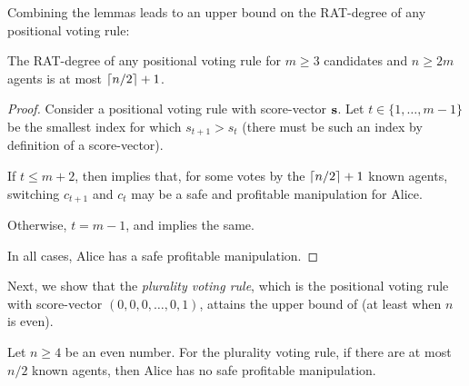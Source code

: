 Combining the lemmas leads to an upper bound on the RAT-degree of any positional voting rule:
\begin{theorem}
\label{thm:upper-positional}
The RAT-degree of any positional voting rule for $m\geq 3$ candidates and $n\geq 2m$ agents is at most $\left\lceil n/2 \right\rceil+1$.
\end{theorem}
\begin{proof}
Consider a positional voting rule with score-vector $\mathbf{s}$. Let $t \in \{1,\ldots,m-1\}$ be the smallest index for which $s_{t+1} > s_t$ (there must be such an index by definition of a score-vector).

If $t\leq m+2$, then  implies that, for some votes by the $\left\lceil n/2 \right\rceil+1$ known agents, switching $c_{t+1}$ and $c_t$ may be a safe and profitable manipulation for Alice.

Otherwise, $t=m-1$, and  implies the same.

In all cases, Alice has a safe profitable manipulation.
\end{proof}

Next, we show that the \emph{plurality voting rule}, which is the positional voting rule with score-vector $(0,0,0,\ldots,0,1)$, attains the upper bound of 
(at least when $n$ is even).


\begin{lemmarep}
\label{lem:lower-plurality}
Let $n\geq 4$ be an even number.
For the plurality voting rule,  if there are at most $n/2$ known agents, then Alice has no safe profitable manipulation.
\end{lemmarep}

